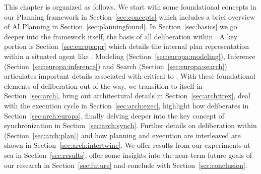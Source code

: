 This chapter is organized as follows. We start with some foundational
concepts in our Planning framework in Section~\ref{sec:concepts} which
includes a brief overview of AI Planning in
Section~\ref{sec:planningfound}. In Section~\ref{sec:basics} we go
deeper into the \eu framework itself, the basis of all deliberation
within \rxe. A key portion is Section~\ref{sec:europa:pr} which
details the internal plan representation within a situated agent like
\rxe. Modeling (Section~\ref{sec:europa:modeling}), Inference
(Section~\ref{sec:europa:inference}) and Search
(Section~\ref{sec:europa:search}) articulates important details
associated with \eu critical to \rxe.  With these foundational
elements of deliberation out of the way, we transition to \rx itself
in Section~\ref{sec:arch}, bring out architectural details in
Section~\ref{sec:arch:trex}, deal with the execution cycle in
Section~\ref{sec:arch:exec}, highlight how \rx deliberates in
Section~\ref{sec:arch:europa}, finally delving deeper into the key
concept of synchronization in Section~\ref{sec:arch:synch}. Further
details on deliberation within \rx (Section~\ref{sec:arch:plan}) and
how planning and execution are interleaved are shown in
Section~\ref{sec:arch:intertwine}. We offer results from our
experiments at sea in Section~\ref{sec:results}, offer some insights
into the near-term future goals of our research in
Section~\ref{sec:future} and conclude with
Section~\ref{sec:conclusion}.

